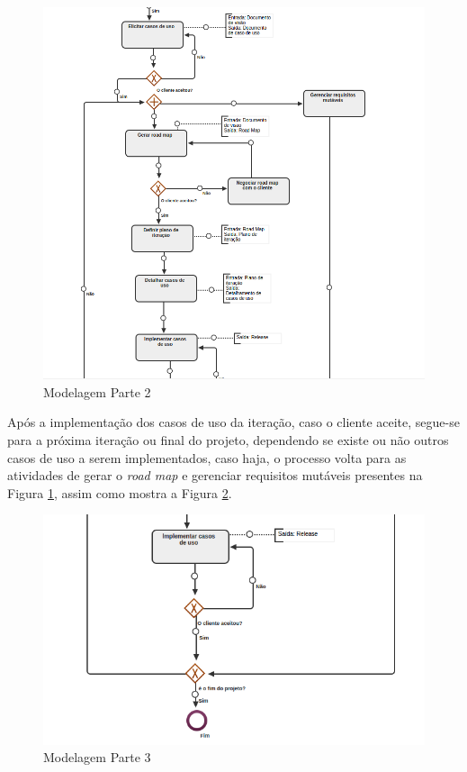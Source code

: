 \begin{figure}[H]
	\centering
	\includegraphics[width=1\textwidth]{imgModelagem/modelagem2}
	\caption{Modelagem Parte 2}
	\label{img:modelagem2}
\end{figure}

Após a implementação dos casos de uso da iteração, caso o cliente aceite, segue-se para a próxima iteração ou final do projeto, dependendo se existe ou não outros casos de uso a serem implementados, caso haja, o processo volta para as atividades de gerar o \textit{road map}  e gerenciar requisitos mutáveis presentes na Figura \ref{img:modelagem2}, assim como mostra a Figura \ref{img:modelagem3}.

\begin{figure}[H]
	\centering
	\includegraphics[width=1\textwidth]{imgModelagem/modelagem3}
	\caption{Modelagem Parte 3}
	\label{img:modelagem3}
\end{figure}
